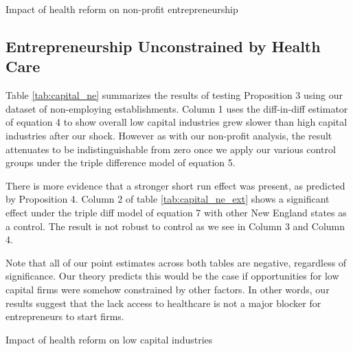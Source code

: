 \documentclass[12pt]{article}
\begin{document}
\begin{table}[H]
	\centering
	
	\caption{Impact of health reform on non-profit entrepreneurship}
	\label{tab:nonprofit}
\end{table}

\begin{comment}

\begin{table}[H]
	\centering
	
	\caption{Impact of health reform on non-profit entrepreneurship}
\end{table}

\end{comment}

\subsection{Entrepreneurship Unconstrained by Health Care}

Table \ref{tab:capital_ne} summarizes the results of testing Proposition 3 using our dataset of non-employing establishments. Column 1 uses the diff-in-diff estimator of equation 4 to show overall low capital industries grew slower than high capital industries after our shock. However as with our non-profit analysis, the result attenuates to be indistinguishable from zero once we apply our various control groups under the triple difference model of equation 5. 

There is more evidence that a stronger short run effect was present, as predicted by Proposition 4. Column 2 of table \ref{tab:capital_ne_ext} shows a significant effect under the triple diff model of equation 7 with other New England states as a control. The result is not robust to control as we see in Column 3 and Column 4. 

Note that all of our point estimates across both tables are negative, regardless of significance. Our theory predicts this would be the case if opportunities for low capital firms were somehow constrained by other factors. In other words, our results suggest that the lack access to healthcare is not a major blocker for entrepreneurs to start firms. 

\begin{table}[H]
	\centering
	
	\caption{Impact of health reform on low capital industries}
	\label{tab:capital_ne}
\end{table} 

\begin{comment}

\begin{table}[H]
	\centering
	
	\caption{Impact of health reform on low capital industries}
\end{table}

\end{comment}
\end{document}
